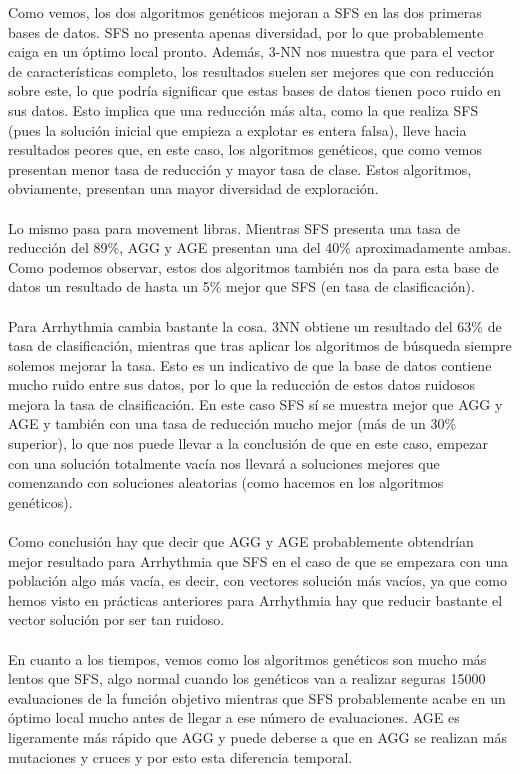 Como vemos, los dos algoritmos genéticos mejoran a SFS en las dos primeras bases de datos. SFS no presenta apenas diversidad, por lo que probablemente caiga en un óptimo local pronto. Además, 3-NN nos muestra que para el vector de características completo, los resultados suelen ser mejores que con reducción sobre este, lo que podría significar que estas bases de datos tienen poco ruido en sus datos. Esto implica que una reducción más alta, como la que realiza SFS (pues la solución inicial que empieza a explotar es entera falsa), lleve hacia resultados peores que, en este caso, los algoritmos genéticos, que como vemos presentan menor tasa de reducción y mayor tasa de clase. Estos algoritmos, obviamente, presentan una mayor diversidad de exploración.
\\
\\
Lo mismo pasa para movement libras. Mientras SFS presenta una tasa de reducción del 89\%, AGG y AGE presentan una del 40\% aproximadamente ambas. Como podemos observar, estos dos algoritmos también nos da para esta base de datos un resultado de hasta un 5\% mejor que SFS (en tasa de clasificación).
\\
\\
Para Arrhythmia cambia bastante la cosa. 3NN obtiene un resultado del 63\% de tasa de clasificación, mientras que tras aplicar los algoritmos de búsqueda siempre solemos mejorar la tasa. Esto es un indicativo de que la base de datos contiene mucho ruido entre sus datos, por lo que la reducción de estos datos ruidosos mejora la tasa de clasificación. En este caso SFS sí se muestra mejor que AGG y AGE y también con una tasa de reducción mucho mejor (más de un 30\% superior), lo que nos puede llevar a la conclusión de que en este caso, empezar con una solución totalmente vacía nos llevará a soluciones mejores que comenzando con soluciones aleatorias (como hacemos en los algoritmos genéticos).
\\
\\
Como conclusión hay que decir que AGG y AGE probablemente obtendrían mejor resultado para Arrhythmia que SFS en el caso de que se empezara con una población algo más vacía, es decir, con vectores solución más vacíos, ya que como hemos visto en prácticas anteriores para Arrhythmia hay que reducir bastante el vector solución por ser tan ruidoso.
\\
\\
En cuanto a los tiempos, vemos como los algoritmos genéticos son mucho más lentos que SFS, algo normal cuando los genéticos van a realizar seguras 15000 evaluaciones de la función objetivo mientras que SFS probablemente acabe en un óptimo local mucho antes de llegar a ese número de evaluaciones. AGE es ligeramente más rápido que AGG y puede deberse a que en AGG se realizan más mutaciones y cruces y por esto esta diferencia temporal.
